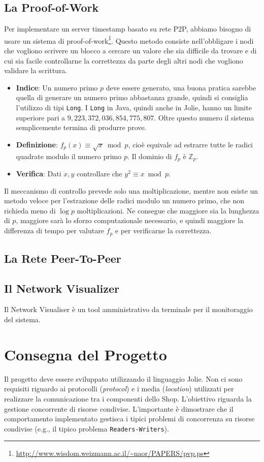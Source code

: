 \documentclass[12pt,a4paper,draft]{article}
\begin{document}
\subsection{La Proof-of-Work}
%
Per implementare un server timestamp basato su rete P2P, abbiamo bisogno di usare un sistema di proof-of-work\footnote{\url{http://www.wisdom.weizmann.ac.il/~naor/PAPERS/pvp.ps}}. Questo metodo consiste nell'obbligare i nodi che vogliono scrivere un blocco a cercare un valore che sia difficile da trovare e di cui sia facile controllarne la correttezza da parte degli altri nodi che vogliono validare la scrittura.
%
\begin{itemize}
    \item \textbf{Indice}: Un numero primo $p$ deve essere generato, una buona pratica sarebbe quella di generare un numero primo abbastanza grande, quindi si consiglia l'utilizzo di tipi \texttt{Long}. I \texttt{Long} in Java, quindi anche in Jolie, hanno un limite superiore pari a $9,223,372,036,854,775,807$. Oltre questo numero il sistema semplicemente termina di produrre prove.
    \item \textbf{Definizione}: $f_p(x) \equiv \sqrt{x} \bmod p$, cioè equivale ad estrarre tutte le radici quadrate modulo il numero primo $p$. Il dominio di $f_p$ è $\mathbb{Z}_p$.
    \item \textbf{Verifica}:  Dati $x,y$ controllare che $y^2 \equiv x \bmod p$.
\end{itemize}
%
Il meccanismo di controllo prevede solo una moltiplicazione, mentre non esiste un metodo veloce per l'estrazione delle radici modulo un numero primo, che non richieda meno di $\log{p}$ moltiplicazioni. Ne consegue che maggiore sia la lunghezza di $p$, maggiore sarà lo sforzo computazionale necessario, e quindi maggiore la differenza di tempo per valutare $f_p$ e per verificarne la correttezza.
%
\subsection{La Rete Peer-To-Peer}
%

\subsection{Il Network Visualizer}
Il Network Visualiser è un tool amministrativo da terminale per il monitoraggio del sistema.

\section{Consegna del Progetto}
Il progetto deve essere sviluppato utilizzando il linguaggio Jolie.
Non ci sono requisiti riguardo ai protocolli (\textit{protocol}) e i media (\textit{location}) utilizzati per realizzare la comunicazione tra i componenti dello Shop. 
L'obiettivo riguarda la gestione concorrente di risorse condivise. 
L'importante è dimostrare che il comportamento implementato gestisca i tipici problemi di concorrenza su risorse condivise (e.g., il tipico problema \texttt{Readers-Writers}).
\end{document}
